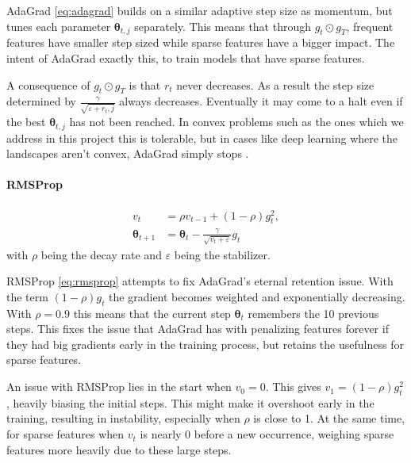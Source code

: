 \documentclass[reprint,english,notitlepage]{revtex4-2}  %
\begin{document}
AdaGrad \eqref{eq:adagrad} builds on a similar adaptive step size as momentum, but tunes each parameter $\bm{\theta}_{t,j}$ separately. This means that through $g_t \odot g_T$, frequent features have smaller step sized while sparse features have a bigger impact. The intent of AdaGrad exactly this, to train models that have sparse features.

A consequence of $g_t \odot g_T$ is that $r_{t}$ never decreases. As a result the step size determined by $\frac{\gamma}{\sqrt{\varepsilon + r_t,j}}$ always decreases. Eventually it may come to a halt even if the best $\bm{\theta}_{t,j}$ has not been reached. In convex problems such as the ones which we address in this project this is tolerable, but in cases like deep learning where the landscapes aren't convex, AdaGrad simply stops \cite{addition_w38}.


\paragraph{RMSProp}
\begin{equation}
\begin{aligned}
v_{t} &= \rho v_{t-1} + (1-\rho)g_t^2, \\
\bm{\theta}_{t+1} &= \bm{\theta}_{t}
 - \frac{\gamma }{\sqrt{v_{t}+\varepsilon}}g_t
\end{aligned}
\label{eq:rmsprop}
\end{equation}
with $\rho$ being the decay rate and $\varepsilon$ being the stabilizer.

RMSProp \eqref{eq:rmsprop} attempts to fix AdaGrad's eternal retention issue. With the term $(1-\rho)g_t$ the gradient becomes weighted and exponentially decreasing. With $\rho = 0.9$ this means that the current step $\bm{\theta}_t$ remembers the 10 previous steps. This fixes the issue that AdaGrad has with penalizing features forever if they had big gradients early in the training process, but retains the usefulness for sparse features. 

An issue with RMSProp lies in the start when $v_0=0$. This gives $v_{1}=(1-\rho)g_t^2$, heavily biasing the initial steps. This might make it overshoot early in the training, resulting in instability, especially when $\rho$ is close to 1. At the same time, for sparse features when $v_t$ is nearly 0 before a new occurrence, weighing sparse features more heavily due to these large steps. 
\end{document}
